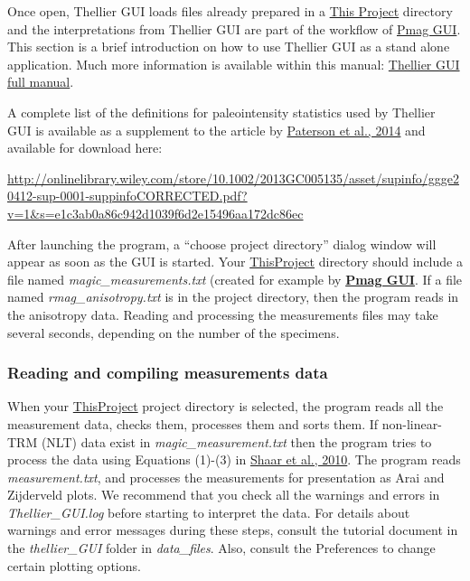 \documentclass[11pt]{book}
\begin{document}
{{Once open, Thellier GUI loads  files already prepared in a  \href{#ThisProject}{This Project} directory and the interpretations from Thellier GUI are part of the workflow of  \href{#pmag_gui.py}{Pmag GUI}.   This section is a brief introduction on how to use Thellier GUI as a stand alone application. Much more information is available within this manual: \href{https://github.com/PmagPy/PmagPy-Cookbook/blob/gh-pages/thellier_GUI_full_manual.pdf}{Thellier GUI full manual}.

\noindent  A complete list of the definitions for paleointensity statistics used by Thellier GUI is available as a supplement to the article by \href{#http://dx.doi.org/10.1002/2013GC005135}{Paterson et al., 2014}  \nocite{paterson14} and available for download here:

  \url{http://onlinelibrary.wiley.com/store/10.1002/2013GC005135/asset/supinfo/ggge20412-sup-0001-suppinfoCORRECTED.pdf?v=1&s=e1c3ab0a86c942d1039f6d2e15496aa172dc86ec}

After launching the program,  a  ``choose project directory'' dialog window will appear as soon as the GUI is started.
%
%
%
Your  \href{#Project_Directory}{ThisProject} directory should include a file named {\it magic\_measurements.txt} (created for example by \href{#pmag_gui.py}{\bf Pmag GUI}.   If a file named {\it rmag\_anisotropy.txt} is in the project directory, then the program reads in the anisotropy data. Reading and processing the measurements files may take several seconds, depending on the number of the specimens.


\subsubsection{Reading and compiling measurements data}
When your \href{#Project_Directory}{ThisProject}  project directory is selected, the program  reads all the measurement data, checks them, processes them and sorts them. If non-linear-TRM (NLT) data exist in {\it magic\_measurement.txt}  then the program tries to process the data using Equations (1)-(3) in \href{http://dx.doi.org/10.7288/V4/MAGIC/12116}{Shaar et al., 2010}. \nocite{shaar10}  The program reads {\it measurement.txt}, and processes the measurements for presentation as Arai  and Zijderveld plots.
We recommend that you check all the warnings and errors in {\it Thellier\_GUI.log} before starting to interpret the data.  For details about warnings and error messages during these steps, consult the tutorial document in the {\it thellier\_GUI} folder in  {\it data\_files}.  Also, consult the Preferences to change certain plotting options.

}}
\end{document}
